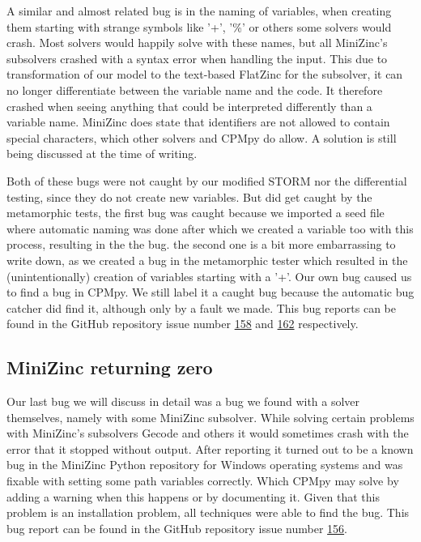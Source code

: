 A similar and almost related bug is in the naming of variables, when creating them starting with strange symbols like '+', '\%' or others some solvers would crash. Most solvers would happily solve with these names, but all MiniZinc's subsolvers crashed with a syntax error when handling the input. This due to transformation of our model to the text-based FlatZinc for the subsolver, it can no longer differentiate between the variable name and the code. It therefore crashed when seeing anything that could be interpreted differently than a variable name. MiniZinc does state that identifiers are not allowed to contain special characters, which other solvers and CPMpy do allow. A solution is still being discussed at the time of writing.


Both of these bugs were not caught by our modified STORM nor the differential testing, since they do not create new variables. But did get caught by the metamorphic tests, the first bug was caught because we imported a seed file where automatic naming was done after which we created a variable too with this process, resulting in the the bug. the second one is a bit more embarrassing to write down, as we created a bug in the metamorphic tester which resulted in the (unintentionally) creation of variables starting with a '+'. Our own bug caused us to find a bug in CPMpy. We still label it a caught bug because the automatic bug catcher did find it, although only by a fault we made. This bug reports can be found in the GitHub repository issue number \href{https://github.com/CPMpy/cpmpy/issues/158}{158} and \href{https://github.com/CPMpy/cpmpy/issues/162}{162} respectively.


\subsection{MiniZinc returning zero}
\label{res:bug:MinizincZero}
Our last bug we will discuss in detail was a bug we found with a solver themselves, namely with some MiniZinc subsolver. While solving certain problems with MiniZinc's subsolvers Gecode and others it would sometimes crash with the error that it stopped without output. After reporting it turned out to be a known bug in the MiniZinc Python repository for Windows operating systems and was fixable with setting some path variables correctly. Which CPMpy may solve by adding a warning when this happens or by documenting it.
Given that this problem is an installation problem, all techniques were able to find the bug. This bug report can be found in the GitHub repository issue number \href{https://github.com/CPMpy/cpmpy/issues/156}{156}.

